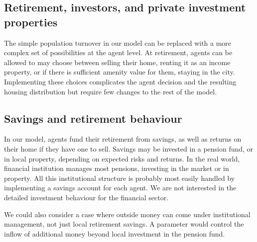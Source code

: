 


\subsection{Retirement, investors, and private investment properties}
The simple population turnover in our model can be replaced with a more complex set of possibilities at the agent level.  At retirement,  agents can be allowed to may choose between selling their home, renting it as an income property, or if there is sufficient amenity value for them, staying in the city. Implementing these choices complicates the agent decision and the resulting housing distribution but require few changes to the rest of the model.

\subsection{Savings and retirement behaviour}
In our model, agents fund their retirement from savings, as well as returns on their home if they have one to sell. Savings may be invested in a pension fund, or in local property,  depending on expected risks and returns. In the real world, financial institution manages most pensions, investing in the market or in property.  All this institutional structure is probably most easily handled by implementing a savings account for each agent. We are not interested in the detailed investment behaviour for the financial sector.%


We could also consider a case where outside money can come under institutional management, not just local retirement savings. A parameter would control the inflow of additional money beyond local investment in the pension fund. 



